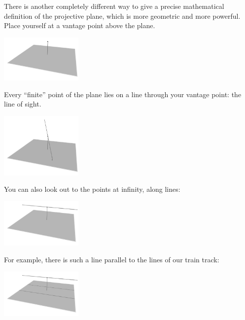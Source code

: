 There is another completely different way to give a precise mathematical definition of the projective plane, which is more geometric and more powerful.
Place yourself at a vantage point above the plane.
\begin{center}
\includegraphics[width=4cm]{above-the-plane-vantage}
\end{center}
Every ``finite'' point of the plane lies on a line through your vantage point: the line of sight.
\begin{center}
\includegraphics[width=4cm]{above-the-plane-connect}
\end{center}
You can also look out to the points at infinity, along lines:
\begin{center}
\includegraphics[width=4cm]{above-the-plane-off-to-infinity}
\end{center}
For example, there is such a line  parallel to the lines of our train track:
\begin{center}
\includegraphics[width=4cm]{above-the-plane-3}
\end{center}

